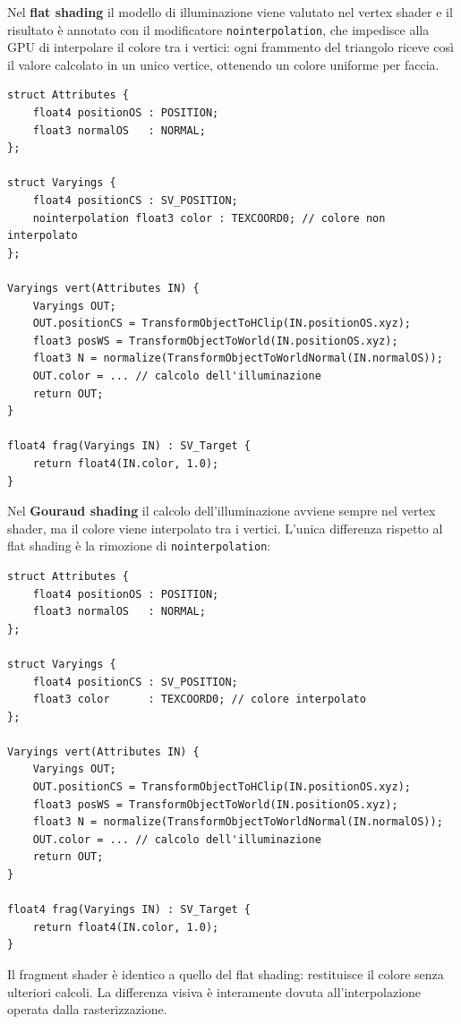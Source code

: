 \documentclass[12pt,a4paper,twoside]{book}
\begin{document}
\begin{minipage}{\textwidth}

Nel \textbf{flat shading} il modello di illuminazione viene valutato nel vertex shader e il risultato è annotato con il modificatore \texttt{nointerpolation}, che impedisce alla GPU di interpolare il colore tra i vertici: ogni frammento del triangolo riceve così il valore calcolato in un unico vertice, ottenendo un colore uniforme per faccia.

\begin{lstlisting}[style=hlsl,
    caption={Implementazione del flat shading.},
    label={lst:flat-impl}]
struct Attributes {
    float4 positionOS : POSITION;
    float3 normalOS   : NORMAL;
};

struct Varyings {
    float4 positionCS : SV_POSITION;
    nointerpolation float3 color : TEXCOORD0; // colore non interpolato
};

Varyings vert(Attributes IN) {
    Varyings OUT;
    OUT.positionCS = TransformObjectToHClip(IN.positionOS.xyz);
    float3 posWS = TransformObjectToWorld(IN.positionOS.xyz);
    float3 N = normalize(TransformObjectToWorldNormal(IN.normalOS));
    OUT.color = ... // calcolo dell'illuminazione
    return OUT;
}

float4 frag(Varyings IN) : SV_Target {
    return float4(IN.color, 1.0);
}
\end{lstlisting}
\end{minipage}

\begin{minipage}{\textwidth}

Nel \textbf{Gouraud shading} il calcolo dell'illuminazione avviene sempre nel vertex shader, ma il colore viene interpolato tra i vertici. L'unica differenza rispetto al flat shading è la rimozione di \texttt{nointerpolation}:

\begin{lstlisting}[style=hlsl,
    caption={Implementazione del Gouraud shading.},
    label={lst:gouraud-impl}]
struct Attributes {
    float4 positionOS : POSITION;
    float3 normalOS   : NORMAL;
};

struct Varyings {
    float4 positionCS : SV_POSITION;
    float3 color      : TEXCOORD0; // colore interpolato
};

Varyings vert(Attributes IN) {
    Varyings OUT;
    OUT.positionCS = TransformObjectToHClip(IN.positionOS.xyz);
    float3 posWS = TransformObjectToWorld(IN.positionOS.xyz);
    float3 N = normalize(TransformObjectToWorldNormal(IN.normalOS));
    OUT.color = ... // calcolo dell'illuminazione
    return OUT;
}

float4 frag(Varyings IN) : SV_Target {
    return float4(IN.color, 1.0);
}
\end{lstlisting}

Il fragment shader è identico a quello del flat shading: restituisce il colore senza ulteriori calcoli. La differenza visiva è interamente dovuta all'interpolazione operata dalla rasterizzazione.

\end{minipage}
\end{document}
